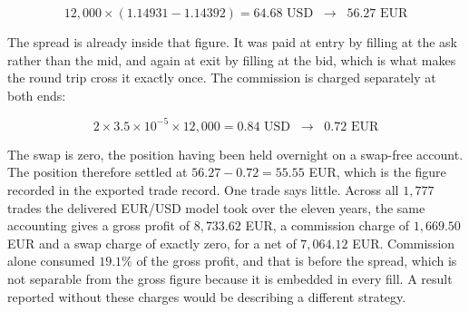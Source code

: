 \begin{equation}
12{,}000 \times \left(1.14931 - 1.14392\right) = 64.68 \text{ USD} \;\;\longrightarrow\;\; 56.27 \text{ EUR}
\label{Equation:WorkedGross}
\end{equation}

The spread is already inside that figure. It was paid at entry by filling at the ask rather than the mid, and again at exit by filling at the bid, which is what makes the round trip cross it exactly once. The commission is charged separately at both ends:

\begin{equation}
2 \times 3.5 \times 10^{-5} \times 12{,}000 = 0.84 \text{ USD} \;\;\longrightarrow\;\; 0.72 \text{ EUR}
\label{Equation:WorkedCommission}
\end{equation}

The swap is zero, the position having been held overnight on a swap-free account. The position therefore settled at $56.27 - 0.72 = 55.55$ EUR, which is the figure recorded in the exported trade record. One trade says little. Across all $1{,}777$ trades the delivered EUR/USD model took over the eleven years, the same accounting gives a gross profit of $8{,}733.62$ EUR, a commission charge of $1{,}669.50$ EUR and a swap charge of exactly zero, for a net of $7{,}064.12$ EUR. Commission alone consumed $19.1\%$ of the gross profit, and that is before the spread, which is not separable from the gross figure because it is embedded in every fill. A result reported without these charges would be describing a different strategy.
